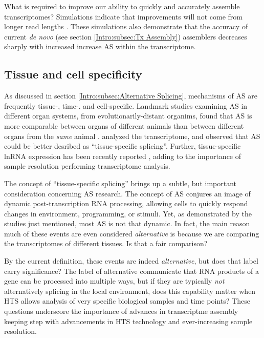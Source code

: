     What is required to improve our ability to quickly and accurately assemble transcriptomes? Simulations indicate that improvements will not come from longer read lengths \citep{Chang2014c}. These simulations also demonstrate that the accuracy of current \textit{de novo} (see section \ref{Intro:subsec:Tx Assembly}) assemblers decreases sharply with increased increase AS within the transcriptome.

  \subsection{Tissue and cell specificity}
    \label{Disc:subsec:Tissue-specific Tx expression}

    As discussed in section \ref{Intro:subsec:Alternative Splicing}, mechanisms of AS are frequently tissue-, time-. and cell-specific. Landmark studies examining AS in different organ systems, from evolutionarily-distant organims, found that AS is more comparable between organs of different animals than between different organs from the \textit{same} animal \citep{Barbosa-Morais2012,Merkin2012}. \citet{Brown2014} analyzed the \flies{} transcriptome, and observed that AS could be better desribed as ``tissue-specific splicing''. Further, tissue-specific lnRNA expression has been recently reported \citep{Washietl2014}, adding to the importance of sample resolution performing transcriptome analysis.

    The concept of ``tissue-specific splicing'' brings up a subtle, but important consideration concerning AS research. The concept of AS conjures an image of dynamic post-transcription RNA processing, allowing cells to quickly respond changes in environment, programming, or stimuli. Yet, as demonstrated by the studies just mentioned, most AS is not that dynamic. In fact, the main reason much of these events are even considered \textit{alternative} is because we are comparing the transcriptomes of different tissues. Is that a fair comparison?

    By the current definition, these events are indeed \textit{alternative}, but does that label carry significance? The label of alternative communicate that RNA products of a gene can be processed into multiple ways, but if they are typically \textit{not} alternatively splicing in the local environment, does this capability matter when HTS allows analysis of very specific biological samples and time points? These questions underscore the importance of advances in transcriptme assembly keeping step with advancements in HTS technology and ever-increasing sample resolution.


